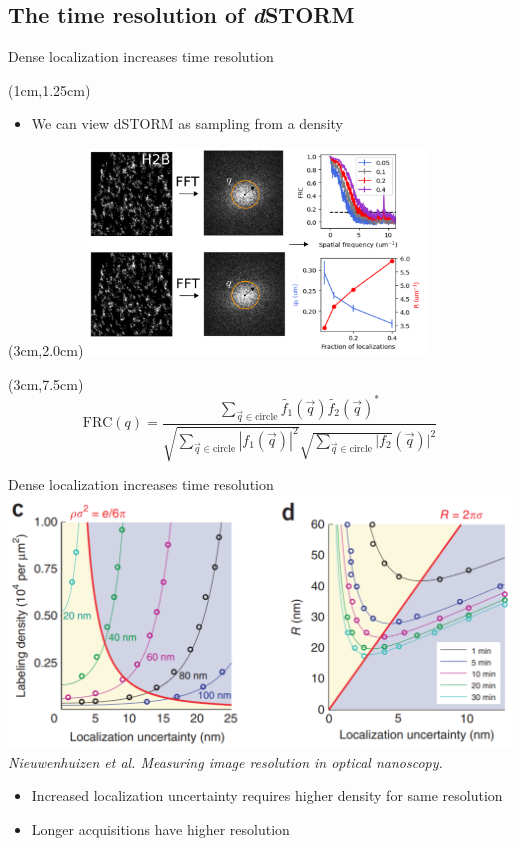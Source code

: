 \documentclass{beamer}					%
\begin{document}
\subsection{The time resolution of \textit{d}STORM}
\begin{frame}{Dense localization increases time resolution}
\begin{textblock*}{13cm}(1cm,1.25cm)
\begin{itemize}
\item We can view dSTORM as sampling from a density
\end{itemize}
\end{textblock*}
\begin{textblock*}{9cm}(3cm,2.0cm)
\includegraphics[width=9cm]{FRC.png}
\end{textblock*}
\begin{textblock*}{8cm}(3cm,7.5cm)
\begin{equation*}
\mathrm{FRC}(q) = \frac{\sum_{\vec{q}\in\mathrm{circle}}\tilde{f_{1}}(\vec{q})\tilde{f_{2}}(\vec{q})^{*}}{\sqrt{\sum_{\vec{q}\in\mathrm{circle}}|f_{1}(\vec{q})|^{2}}\sqrt{\sum_{\vec{q}\in\mathrm{circle}}|f_{2}}(\vec{q})|^{2}}
\end{equation*}
\end{textblock*}
\end{frame}

\begin{frame}{Dense localization increases time resolution}
\includegraphics[width=\textwidth]{Spatial.png}
\textit{Nieuwenhuizen et al. Measuring image resolution in optical nanoscopy.}\\
\begin{itemize}
\item Increased localization uncertainty requires higher density for same resolution
\item Longer acquisitions have higher resolution
\end{itemize}

\end{frame}
\end{document}
